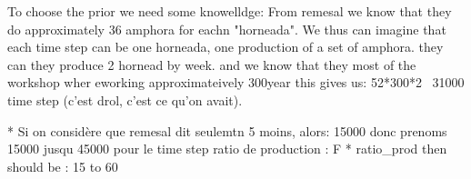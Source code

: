 To choose the prior we need some knowelldge:
From remesal we know that they do approximately 36 amphora for eachn "horneada". We thus can imagine that each time step can be one horneada, one production of a set of amphora. they can they produce 2 hornead by week. and we know that they  most of the workshop wher eworking approximateively 300year this gives us:
52*300*2 ~31000 time step (c'est drol, c'est ce qu'on avait).

* Si on considère que remesal dit seulemtn 5 moins, alors: 15000 donc prenoms 15000 jusqu 45000 pour le time step ratio de production : F
* ratio_prod then should be : 15 to 60


